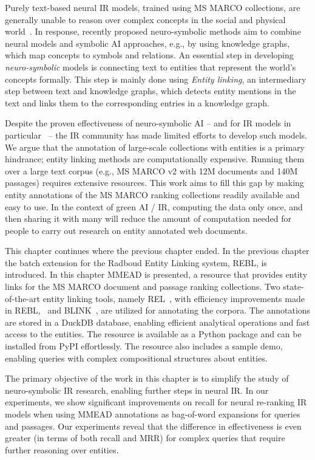 Purely text-based neural IR models, trained using MS MARCO collections, are generally unable to reason over complex concepts in the social and physical world~\citep{bosselut2021dynamic, sciavolino:2021:simple}. In response, recently proposed neuro-symbolic methods aim to combine neural models and symbolic AI approaches, e.g., by using knowledge graphs, which map concepts to symbols and relations. An essential step in developing \textit{neuro-symbolic} models is connecting text to entities that represent the world's concepts formally. This step is mainly done using \textit{Entity linking}, an intermediary step between text and knowledge graphs, which detects entity mentions in the text and links them to the corresponding entries in a knowledge graph.

Despite the proven effectiveness of neuro-symbolic AI -- and for IR models in particular~\citep{Tran:2022:DRE, Gerritse:2022:EMBERT, chatterjee2022bert} -- the IR community has made limited efforts to develop such models. We argue that the annotation of large-scale collections with entities is a primary hindrance; entity linking methods are computationally expensive. Running them over a large text corpus (e.g., MS MARCO v2 with 12M documents and 140M passages) requires extensive resources. This work aims to fill this gap by making entity annotations of the MS MARCO ranking collections readily available and easy to use. In the context of green AI / IR, computing the data only once, and then sharing it with many will reduce the amount of computation needed for people to carry out research on entity annotated web documents.

This chapter continues where the previous chapter ended. In the previous chapter the batch extension for the Radboud Entity Linking system, REBL, is introduced. In this chapter MMEAD is presented, a resource that provides entity links for the MS MARCO document and passage ranking collections. Two state-of-the-art entity linking tools, namely REL~\citep{rel}, with efficiency improvements made in REBL,~\citep{rebl} and BLINK~\citep{blink}, are utilized for annotating the corpora. The annotations are stored in a DuckDB database, enabling efficient analytical operations and fast access to the entities. The resource is available as a Python package and can be installed from PyPI effortlessly. The resource also includes a sample demo, enabling queries with complex compositional structures about entities. 

The primary objective of the work in this chapter is to simplify the study of neuro-symbolic IR research, enabling further steps in neural IR. In our experiments, we show significant improvements on recall for neural re-ranking IR models when using MMEAD annotations as bag-of-word expansions for queries and passages. Our experiments reveal that the difference in effectiveness is even greater (in terms of both recall and MRR) for complex queries that require further reasoning over entities.

